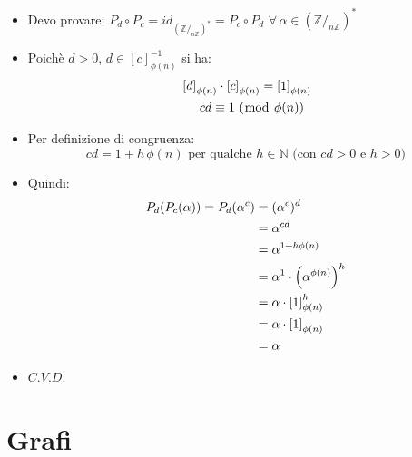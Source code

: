 \documentclass[10pt]{article}
\begin{document}
\begin{itemize}
\item
Devo provare: $P_d \circ P_c = id_{\left(\mathbb{Z}/_{n \mathbb{Z}}\right)^{*}} = P_c \circ P_d \,\,\forall \, \alpha \in \left(\mathbb{Z}/_{n \mathbb{Z}}\right)^{*}$
\item
Poichè $d > 0$, $d \in \left[c\right]^{-1}_{\phi(n)}$ si ha:
\begin{equation} 
\begin{split}
&\left[d\right]_{\phi(n)} \cdot \left[c\right]_{\phi(n)} = \left[1\right]_{\phi(n)} \\
&\quad\,\,\, cd \equiv 1 \,\,(\bmod \,\, \phi(n))
\notag
\end{split}
\end{equation}
\item
Per definizione di congruenza: $$cd = 1 + h\,\phi(n) \textrm{ per qualche } h \in \mathbb{N} \textrm{ (con } cd > 0 \textrm{ e } h > 0)$$
\item
Quindi:
\begin{equation} 
\begin{split} 
P_d(P_c(\alpha)) = P_d(\alpha^c)  
&= (\alpha^c)^d \\
&= \alpha^{cd} \\
&= \alpha^{1 + h\phi(n)} \\
&= \alpha^1 \cdot  \left(\alpha^{\phi(n)}\right)^h \\
&= \alpha \cdot  \left[1\right]^h_{\phi(n)} \\
&= \alpha \cdot  \left[1\right]_{\phi(n)} \\
&= \alpha
\notag
\end{split}
\end{equation}
\item
$C.V.D.$
\end{itemize}
\newpage
\section{Grafi}
\end{document}
